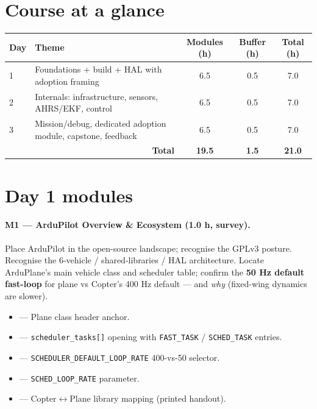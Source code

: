 \documentclass[a4paper,11pt,twoside]{article}
\begin{document}
\section*{Course at a glance}
\begin{center}\small
\begin{tabular}{|l|p{8cm}|c|c|c|}\hline
Day & Theme & Modules (h) & Buffer (h) & Total (h) \\ \hline
1 & Foundations + build + HAL with adoption framing & 6.5 & 0.5 & 7.0 \\ \hline
2 & Internals: infrastructure, sensors, AHRS/EKF, control & 6.5 & 0.5 & 7.0 \\ \hline
3 & Mission/debug, dedicated adoption module, capstone, feedback & 6.5 & 0.5 & 7.0 \\ \hline
\multicolumn{2}{|r|}{\textbf{Total}} & \textbf{19.5} & \textbf{1.5} & \textbf{21.0} \\ \hline
\end{tabular}
\end{center}

\section*{Day 1 modules}

\paragraph{M1 --- ArduPilot Overview \& Ecosystem (1.0 h, survey).}
Place ArduPilot in the open-source landscape; recognise the GPLv3 posture. Recognise the 6-vehicle / shared-libraries / HAL architecture. Locate ArduPlane's main vehicle class and scheduler table; confirm the \textbf{50 Hz default fast-loop} for plane vs Copter's 400 Hz default --- and \emph{why} (fixed-wing dynamics are slower).
\begin{itemize}
  \item {} --- Plane class header anchor.
  \item {} --- \texttt{scheduler\_tasks[]} opening with \texttt{FAST\_TASK} / \texttt{SCHED\_TASK} entries.
  \item {} --- \texttt{SCHEDULER\_DEFAULT\_LOOP\_RATE} 400-vs-50 selector.
  \item {} --- \texttt{SCHED\_LOOP\_RATE} parameter.
  \item {} --- Copter$\leftrightarrow$Plane library mapping (printed handout).
\end{itemize}
\end{document}

